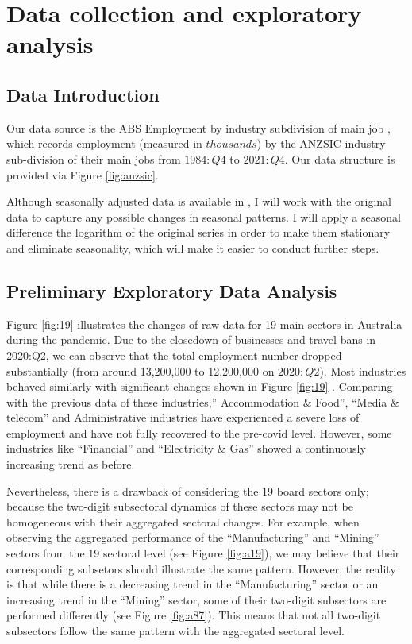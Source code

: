 \documentclass[11pt,a4paper,]{article}
\begin{document}
\hypertarget{data-collection-and-exploratory-analysis}{%
\section{Data collection and exploratory analysis}\label{data-collection-and-exploratory-analysis}}

\hypertarget{data-introduction}{%
\subsection{Data Introduction}\label{data-introduction}}

Our data source is the ABS Employment by industry subdivision of main job \autocite{ABS2022}, which records employment (measured in \(thousands\)) by the ANZSIC industry sub-division of their main jobs from \(1984:Q4\) to \(2021:Q4\). Our data structure is provided via Figure \ref{fig:anzsic}.

Although seasonally adjusted data is available in \autocite{ABS2022}, I will work with the original data to capture any possible changes in seasonal patterns. I will apply a seasonal difference the logarithm of the original series in order to make them stationary and eliminate seasonality, which will make it easier to conduct further steps.

\hypertarget{preliminary-exploratory-data-analysis}{%
\subsection{Preliminary Exploratory Data Analysis}\label{preliminary-exploratory-data-analysis}}

\newpage

Figure \ref{fig:19} illustrates the changes of raw data for 19 main sectors in Australia during the pandemic. Due to the closedown of businesses and travel bans in 2020:Q2, we can observe that the total employment number dropped substantially (from around 13,200,000 to 12,200,000 on \(2020:Q2\)). Most industries behaved similarly with significant changes shown in Figure \ref{fig:19} . Comparing with the previous data of these industries,'' Accommodation \& Food'', ``Media \& telecom'' and Administrative industries have experienced a severe loss of employment and have not fully recovered to the pre-covid level. However, some industries like ``Financial'' and ``Electricity \& Gas'' showed a continuously increasing trend as before.

Nevertheless, there is a drawback of considering the 19 board sectors only; because the two-digit subsectoral dynamics of these sectors may not be homogeneous with their aggregated sectoral changes. For example, when observing the aggregated performance of the ``Manufacturing'' and ``Mining'' sectors from the 19 sectoral level (see Figure \ref{fig:a19}), we may believe that their corresponding subsetors should illustrate the same pattern. However, the reality is that while there is a decreasing trend in the ``Manufacturing'' sector or an increasing trend in the ``Mining'' sector, some of their two-digit subsectors are performed differently (see Figure \ref{fig:a87}). This means that not all two-digit subsectors follow the same pattern with the aggregated sectoral level.
\end{document}
